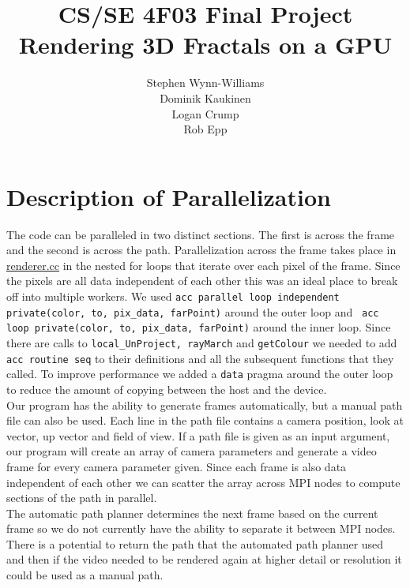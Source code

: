 \documentclass[]{article}
\title{CS/SE 4F03 Final Project \\ Rendering 3D Fractals on a GPU}
\author{Stephen Wynn-Williams \\ Dominik Kaukinen \\Logan Crump \\ Rob Epp }
\begin{document}
\maketitle
\newpage
\tableofcontents

\newpage
\section{Description of Parallelization}
The code can be paralleled in two distinct sections. The first is across the frame and the second is across the path. Parallelization across the frame takes place in \hyperref[subsec:renderer.cc]{renderer.cc} in the nested for loops that iterate over each pixel of the frame. Since the pixels are all data independent of each other this was an ideal place to break off into multiple workers. We used \texttt{acc parallel loop independent private(color, to, pix\_data, farPoint)} around the outer loop and \texttt{ acc loop private(color, to, pix\_data, farPoint)} around the inner loop. Since there are calls to \texttt{local\_UnProject, rayMarch} and \texttt{getColour} we needed to add \texttt{acc routine seq} to their definitions and all the subsequent functions that they called. To improve performance we added a \texttt{data} pragma around the outer loop to reduce the amount of copying between the host and the device. \\

Our program has the ability to generate frames automatically, but a manual path file can also be used. Each line in the path file contains a camera position, look at vector, up vector and field of view. If a path file is given as an input argument, our program will create an array of camera parameters and generate a video frame for every camera parameter given. Since each frame is also data independent of each other we can scatter the array across MPI nodes to compute sections of the path in parallel. \\

The automatic path planner determines the next frame based on the current frame so we do not currently have the ability to separate it between MPI nodes. There is a potential to return the path that the automated path planner used and then if the video needed to be rendered again at higher detail or resolution it could be used as a manual path.
\end{document}
